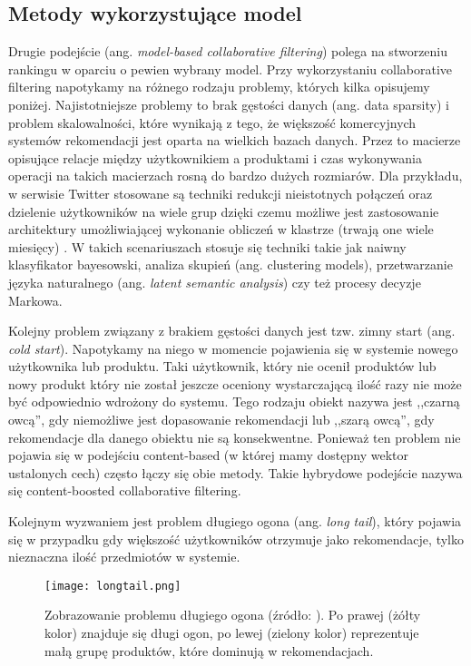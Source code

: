 \subsection{Metody wykorzystujące model}
Drugie podejście (ang. \textit{model-based collaborative filtering}) polega na stworzeniu rankingu w oparciu o pewien wybrany model.
Przy wykorzystaniu collaborative filtering napotykamy na różnego rodzaju problemy, których kilka opisujemy poniżej.   
Najistotniejsze problemy to brak gęstości danych (ang. data sparsity) i problem skalowalności, które wynikają z tego, że większość komercyjnych systemów rekomendacji jest oparta na wielkich bazach danych. Przez to macierze opisujące relacje między użytkownikiem a produktami i czas wykonywania operacji na takich macierzach rosną do bardzo dużych rozmiarów. Dla przykładu, w serwisie Twitter stosowane są techniki redukcji nieistotnych połączeń oraz dzielenie użytkowników na wiele grup dzięki czemu możliwe jest zastosowanie architektury umożliwiającej  wykonanie obliczeń w klastrze (trwają one wiele miesięcy)  \cite{WTF:TheWhotoFollowServiceatTwitter}.
W takich scenariuszach stosuje się techniki takie jak naiwny klasyfikator bayesowski, analiza skupień (ang. clustering models), przetwarzanie języka naturalnego (ang. \textit{latent semantic analysis}) czy też procesy decyzje Markowa.


Kolejny problem związany z brakiem gęstości danych jest tzw. zimny start (ang. \textit{cold start}). Napotykamy na niego w momencie pojawienia się w systemie nowego użytkownika lub produktu. Taki użytkownik, który nie ocenił produktów lub nowy produkt który nie został jeszcze oceniony wystarczającą ilość razy nie może być odpowiednio wdrożony do systemu. 
Tego rodzaju obiekt nazywa jest ,,czarną owcą'', gdy niemożliwe jest dopasowanie rekomendacji lub ,,szarą owcą'', gdy rekomendacje dla danego obiektu nie są konsekwentne. Ponieważ ten problem nie pojawia się w podejściu content-based  (w której mamy dostępny wektor ustalonych cech) często łączy się obie metody. Takie hybrydowe podejście nazywa się content-boosted collaborative filtering. 

Kolejnym wyzwaniem jest problem długiego ogona (ang. \textit{long tail}), który pojawia się w przypadku gdy większość użytkowników otrzymuje jako rekomendacje, tylko nieznaczna ilość przedmiotów w systemie.

\begin{figure}[h]
    \centering
    \texttt{[image: longtail.png]}
    \caption{Zobrazowanie problemu długiego ogona (źródło: \cite{WikipediaEN:Longtail}). Po prawej (żółty kolor) znajduje się długi ogon, po lewej (zielony kolor) reprezentuje małą grupę produktów, które dominują w rekomendacjach.}
    \label{fig:longtail}
\end{figure}


